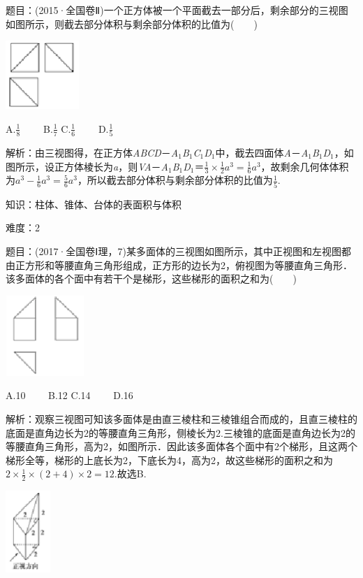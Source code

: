 \documentclass{article} %
\begin{document}
题目：(2015·全国卷Ⅱ)一个正方体被一个平面截去一部分后，剩余部分的三视图如图所示，则截去部分体积与剩余部分体积的比值为(　　)

\includegraphics*[width=1.09in, height=1.02in, keepaspectratio=false]{image69}

A.$\frac{1}{8}$　　 B.$\frac{1}{7}$ C.$\frac{1}{6}$　　 D.$\frac{1}{5}$

解析：由三视图得，在正方体\textit{ABCD}－\textit{A}${}_{1}$\textit{B}${}_{1}$\textit{C}${}_{1}$\textit{D}${}_{1}$中，截去四面体\textit{A}－\textit{A}${}_{1}$\textit{B}${}_{1}$\textit{D}${}_{1}$，如图所示，设正方体棱长为\textit{a}，则\textit{VA}－\textit{A}${}_{1}$\textit{B}${}_{1}$\textit{D}${}_{1}$＝$\frac{1}{3}\times\frac{1}{2}a^3=\frac{1}{6}a^3$，故剩余几何体体积为$a^3-\frac{1}{6}a^3=\frac{5}{6}a^3$，所以截去部分体积与剩余部分体积的比值为$\frac{1}{5}$.

知识：柱体、锥体、台体的表面积与体积

难度：2

题目：(2017·全国卷Ⅰ理，7)某多面体的三视图如图所示，其中正视图和左视图都由正方形和等腰直角三角形组成，正方形的边长为2，俯视图为等腰直角三角形．该多面体的各个面中有若干个是梯形，这些梯形的面积之和为(　　)

\includegraphics*[width=1.18in, height=1.20in, keepaspectratio=false]{image70}

A.10　　 B.12 C.14　　 D.16

解析：观察三视图可知该多面体是由直三棱柱和三棱锥组合而成的，且直三棱柱的底面是直角边长为2的等腰直角三角形，侧棱长为2.三棱锥的底面是直角边长为2的等腰直角三角形，高为2，如图所示．因此该多面体各个面中有2个梯形，且这两个梯形全等，梯形的上底长为2，下底长为4，高为2，故这些梯形的面积之和为$2\times\frac{1}{2}\times(2+4)\times2=12$.故选B.

\includegraphics*[width=0.67in, height=1.22in, keepaspectratio=false]{image71}
\end{document}
